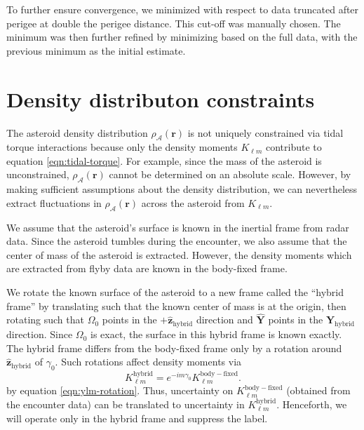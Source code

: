 \documentclass[fleqn,usenatbib]{mnras}
\newcommand{\unit}[1]{\bm{\hat{#1}}}
\begin{document}
To further ensure convergence, we minimized with respect to data truncated after perigee at double the perigee distance. This cut-off was manually chosen. The minimum was then further refined by minimizing based on the full data, with the previous minimum as the initial estimate.


\section{Density distributon constraints}
\label{sec:density-distro}

The asteroid density distribution $\rho_\mathcal{A}(\bm r)$ is not uniquely constrained via tidal torque interactions because only the density moments $K_{\ell m}$ contribute to equation \ref{eqn:tidal-torque}. For example, since the mass of the asteroid is unconstrained, $\rho_\mathcal{A}(\bm r)$ cannot be determined on an absolute scale. However, by making sufficient assumptions about the density distribution, we can nevertheless extract fluctuations in $\rho_\mathcal{A}(\bm r)$ across the asteroid from $K_{\ell m}$.

We assume that the asteroid's surface is known in the inertial frame from radar data. Since the asteroid tumbles during the encounter, we also assume that the center of mass of the asteroid is extracted. However, the density moments which are extracted from flyby data are known in the body-fixed frame.

We rotate the known surface of the asteroid to a new frame called the ``hybrid frame'' by translating such that the known center of mass is at the origin, then rotating such that $\Omega_0$ points in the $+\unit z_\text{hybrid}$ direction and $\unit Y$ points in the $\unit Y_\text{hybrid}$ direction. Since $\Omega_0$ is exact, the surface in this hybrid frame is known exactly. The hybrid frame differs from the body-fixed frame only by a rotation around $\unit z_\text{hybrid}$ of $\gamma_0$. Such rotations affect density moments via 
\begin{equation}
  K_{\ell m}^\mathrm{hybrid} = e^{-im\gamma_0}K_{\ell m}^\mathrm{body-fixed}.
  \label{eqn:body-fixed-to-hybrid}
\end{equation}
by equation \ref{eqn:ylm-rotation}. Thus, uncertainty on $K_{\ell m}^\mathrm{body-fixed}$ (obtained from the encounter data) can be translated to uncertainty in $K_{\ell m}^\mathrm{hybrid}$. Henceforth, we will operate only in the hybrid frame and suppress the label.
\end{document}
